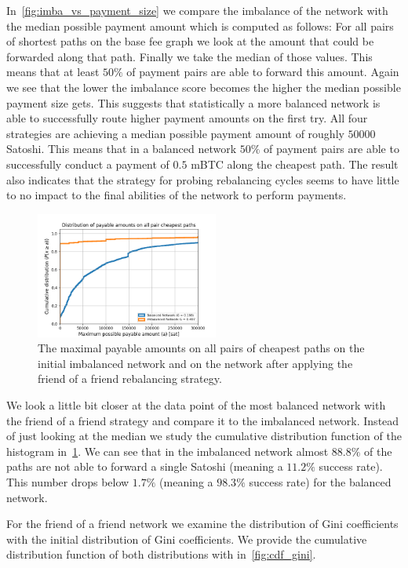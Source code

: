 \documentclass[conference]{IEEEtran}
\begin{document}
In~\cref{fig:imba_vs_payment_size} we compare the imbalance of the network with the median possible payment amount which is computed as follows:
For all pairs of shortest paths on the base fee graph we look at the amount that could be forwarded along that path.
Finally we take the median of those values.
This means that at least $50\%$ of payment pairs are able to forward this amount.
Again we see that the lower the imbalance score becomes the higher the median possible payment size gets.
This suggests that statistically a more balanced network is able to successfully route higher payment amounts on the first try.
All four strategies are achieving a median possible payment amount of roughly $50000$ Satoshi.
This means that in a balanced network $50\%$ of payment pairs are able to successfully conduct a payment of $0.5$ mBTC along the cheapest path. 
The result also indicates that the strategy for probing rebalancing cycles seems to have little to no impact to the final abilities of the network to perform payments.


\begin{figure}
 \centering
 \includegraphics[width=6cm]{code/vs/fig/maximum_payable_amount_all_pair_chepest_paths_balanced_network.png}
 \caption{The maximal payable amounts on all pairs of cheapest paths on the initial imbalanced network and on the network after applying the friend of a friend rebalancing strategy.}
 \label{fig:cdf_paymentsize}
\end{figure}

We look a little bit closer at the data point of the most balanced network with the friend of a friend strategy and compare it to the imbalanced network.
Instead of just looking at the median we study the cumulative distribution function of the histogram in~\cref{fig:cdf_paymentsize}.
We can see that in the imbalanced network almost $88.8\%$ of the paths are not able to forward a single Satoshi (meaning a $11.2\%$ success rate).
This number drops below $1.7\%$ (meaning a $98.3\%$ success rate) for the balanced network.

For the friend of a friend network we examine the distribution of Gini coefficients with the initial distribution of Gini coefficients.
We provide the cumulative distribution function of both distributions with in~\cref{fig:cdf_gini}.
\end{document}
